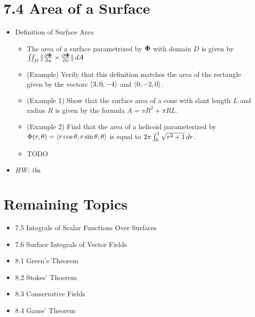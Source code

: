 \documentclass[11pt]{article}
\begin{document}
\section*{7.4 Area of a Surface}

\begin{itemize}
  \item Definition of Surface Area
    \begin{itemize}
      \item The area of a surface parametrized by \(\mathbf{\Phi}\) with domain
            \(D\) is given by
            \(
              \iint_D
                \|\frac{\partial\mathbf{\Phi}}{\partial u}\times\frac{\partial\mathbf{\Phi}}{\partial v}\|
              \,d A
            \)
      \item (Example) Verify that this definition matches the area of the
            rectangle given by the vectors \(\langle3,0,-4\rangle\) and \(\langle0,-2,0\rangle\).
      \item (Example 1) Show that the surface area of a cone with slant length
            \(L\) and radius \(R\) is given by the formula
            \(A=\pi R^2+\pi RL\).
      \item (Example 2) Find that the area of a helicoid parameterized by
            \(\Phi(r,\theta)=\langle r\cos\theta,r\sin\theta,\theta\rangle\) is
            equal to \(2\pi\int_0^1\sqrt{r^2+1}\,d r\).
      \item TODO
    \end{itemize}
  \item\textit{
    HW: tba
  }
\end{itemize}


\section*{Remaining Topics}

\begin{itemize}
  \item 7.5 Integrals of Scalar Functions Over Surfaces
  \item 7.6 Surface Integrals of Vector Fields
  \item 8.1 Green's Theorem
  \item 8.2 Stokes' Thoerem
  \item 8.3 Conservative Fields
  \item 8.4 Gauss' Theorem
\end{itemize}
\end{document}
